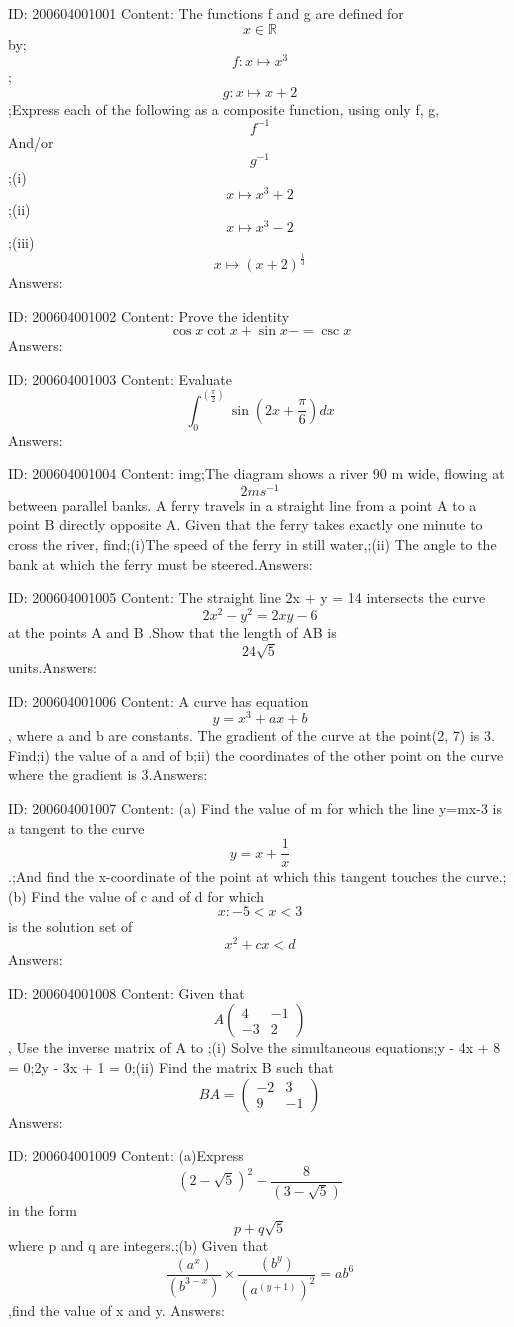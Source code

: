 \documentclass{article}
\begin{document}
ID: 200604001001
Content:
The functions f and g are defined for $$ x\in \mathbb{R} $$ by;$$f:x \mapsto  x^3$$;$$g:x \mapsto x+2$$;Express each of the following as a composite function, using only f, g, $$f^{-1}$$ And/or $$g^{-1}$$;(i) $$ x \mapsto  x^3+2$$;(ii) $$ x \mapsto  x^3-2$$;(iii) $$ x \mapsto  (x+2)^{\frac{1}{3}}$$Answers:

ID: 200604001002
Content:
Prove the identity $$\cos x\cot x+\sin x-=\csc x$$Answers:

ID: 200604001003
Content:
Evaluate $$\int_0^{( \frac{\pi}{2})}\sin (2x+ \frac{\pi}{6})dx$$Answers:

ID: 200604001004
Content:
img;The diagram shows a river 90 m wide, flowing at $$2ms^{-1}$$ between parallel banks. A ferry travels in a straight line from a point A to a point B directly opposite A. Given that the ferry takes exactly one minute to cross the river, find;(i)The speed of the ferry in still water,;(ii)	The angle to the bank at which the ferry must be steered.Answers:

ID: 200604001005
Content:
The straight line 2x + y = 14 intersects the curve $$2x^2-y^2=2xy-6$$ at the points A and B .Show that the length of AB is $$24\sqrt5$$ units.Answers:

ID: 200604001006
Content:
A curve has equation $$y=x^3+ax+b$$, where a and b are constants. The gradient of the curve at the point(2, 7) is 3. Find;i) the value of a and of b;ii) the coordinates of the other point on the curve where the gradient is 3.Answers:

ID: 200604001007
Content:
(a)	Find the value of m for which the line y=mx-3 is a tangent to the curve $$y=x+ \frac{1}{x} $$.;And find the x-coordinate of the point at which this tangent touches the curve.;(b)	Find the value of c and of d for which $${x: -5< x<3 }$$ is the solution set of $$x^2+cx<d$$Answers:

ID: 200604001008
Content:
Given that $$A \begin{pmatrix}4 &-1 \\  -3& 2\end{pmatrix} $$, Use the inverse matrix of A to ;(i) Solve the simultaneous equations;y - 4x + 8 = 0;2y - 3x + 1 = 0;(ii) Find the matrix B such that $$BA= \begin{pmatrix}-2 &3 \\  9& -1\end{pmatrix}$$Answers:

ID: 200604001009
Content:
(a)Express $$(2-\sqrt5)^2-\frac{8}{(3-\sqrt5)}$$ in the form $$p+q\sqrt5$$ where p and q are integers.;(b) Given that $$\frac{(a^x)}{(b^{3-x}) }\times \frac{(b^y)}{(a^{(y+1)})^{2} }=ab^6$$ ,find the value of x and y. Answers:
\end{document}
